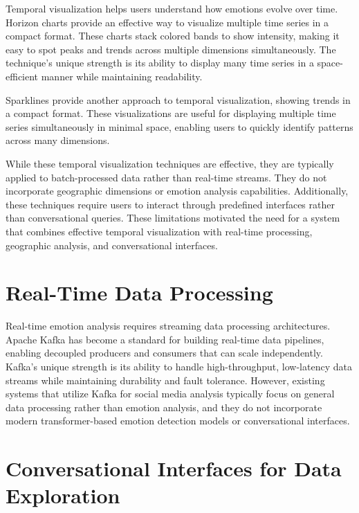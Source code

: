 Temporal visualization helps users understand how emotions evolve over time. Horizon charts \cite{healy2010horizon} provide an effective way to visualize multiple time series in a compact format. These charts stack colored bands to show intensity, making it easy to spot peaks and trends across multiple dimensions simultaneously. The technique's unique strength is its ability to display many time series in a space-efficient manner while maintaining readability.

Sparklines \cite{tufte2006sparklines} provide another approach to temporal visualization, showing trends in a compact format. These visualizations are useful for displaying multiple time series simultaneously in minimal space, enabling users to quickly identify patterns across many dimensions.

While these temporal visualization techniques are effective, they are typically applied to batch-processed data rather than real-time streams. They do not incorporate geographic dimensions or emotion analysis capabilities. Additionally, these techniques require users to interact through predefined interfaces rather than conversational queries. These limitations motivated the need for a system that combines effective temporal visualization with real-time processing, geographic analysis, and conversational interfaces.


\section{Real-Time Data Processing}

Real-time emotion analysis requires streaming data processing architectures. Apache Kafka \cite{kreps2011kafka} has become a standard for building real-time data pipelines, enabling decoupled producers and consumers that can scale independently. Kafka's unique strength is its ability to handle high-throughput, low-latency data streams while maintaining durability and fault tolerance. However, existing systems that utilize Kafka for social media analysis typically focus on general data processing rather than emotion analysis, and they do not incorporate modern transformer-based emotion detection models or conversational interfaces.


\section{Conversational Interfaces for Data Exploration}

